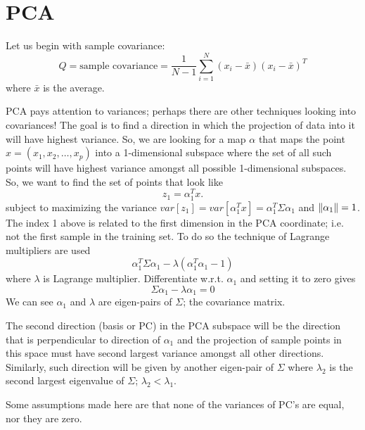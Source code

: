 \section{PCA}
\label{sec:PCA_interview}

Let us begin with sample covariance:
\begin{equation}
Q = \text{sample covariance} = \frac{1}{N-1} \sum_{i=1}^{N}
(x_i - \bar x) (x_i - \bar x)^T
\end{equation}
where $\bar x$ is the average.

PCA pays attention to variances; perhaps there are 
other techniques looking into covariances!
The goal is to find a direction in which the projection
of data into it will have highest variance.
So, we are looking for a map $\alpha$ that
maps the point $x = (x_1, x_2, \dots, x_p)$
into a 1-dimensional subspace where
the set of all such points will have highest variance
amongst all possible 1-dimensional subspaces.
So, we want to find the set of points that look like
\[z_1 = \alpha_1^T x.\]
subject to maximizing the variance 
$var[z_1] = var[\alpha_1^T x] = \alpha_1^T \Sigma \alpha_1$
and $\lVert{\alpha_1}\rVert = 1$.
The index 1 above is related to the first dimension in the
PCA coordinate; i.e. not the first sample in the training set.
To do so the technique of Lagrange multipliers are used
\[ \alpha_1^T \Sigma \alpha_1 - \lambda (\alpha_1^T\alpha_1 -1)\]
where $\lambda$ is Lagrange multiplier.
Differentiate w.r.t. $\alpha_1$ and setting it to zero gives
\[\Sigma \alpha_1 - \lambda \alpha_1 = 0\]
We can see $\alpha_1$ and $\lambda$ are eigen-pairs
of $\Sigma$; the covariance matrix.

The second direction (basis or PC) in the PCA subspace
will be the direction that is perpendicular to direction of
$\alpha_1$ and the projection of sample points in this space
must have second largest variance amongst all other directions.
Similarly, such direction will be given by another eigen-pair of
$\Sigma$ where $\lambda_2$ is the second largest
eigenvalue of $\Sigma$; $\lambda_2 < \lambda_1$.

Some assumptions made here are that
none of the variances of PC's are equal, nor they
are zero.


